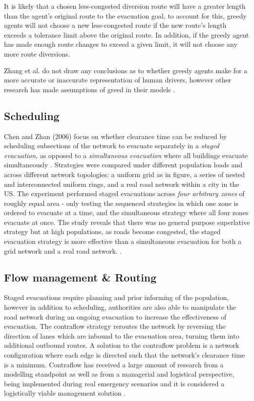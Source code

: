 It is likely that a chosen less-congested diversion route will have a greater length than the agent's original route to the evacuation goal, to account for this, greedy agents will not choose a new less-congested route if the new route's length exceeds a tolerance limit above the original route. In addition, if the greedy agent has made enough route changes to exceed a given limit, it will not choose any more route diversions.

Zhang et al. do not draw any conclusions as to whether greedy agents make for a more accurate or inaccurate representation of human drivers, however other research has made assumptions of greed in their models \cite{Madireddy2011AnManagement}.

\subsection{Scheduling}
Chen and Zhan (2006) focus on whether clearance time can be reduced by scheduling subsections of the network to evacuate separately in a \textit{staged evacuation}, as opposed to a \textit{simultaneous evacuation} where all buildings evacuate simultaneously \cite{Chen2008Agent-basedStrategies}. Strategies were compared under different population loads and across different network topologies: a uniform grid as in figure, a series of nested and interconnected uniform rings, and a real road network within a city in the US. The experiment performed staged evacuations across \textit{four arbitrary zones} of roughly equal area - only testing the sequenced strategies in which one zone is ordered to evacuate at a time, and the simultaneous strategy where all four zones evacuate at once. The study reveals that there was no general purpose superlative strategy but at high populations, as roads become congested, the staged evacuation strategy is more effective than a simultaneous evacuation for both a grid network and a real road network.
\cite{Bish2014OptimalRouting}.

\subsection{Flow management \& Routing}
Staged evacuations require planning and prior informing of the population, however in addition to scheduling, authorities are also able to manipulate the road network during an ongoing evacuation to increase the effectiveness of evacuation. The contraflow strategy reroutes the network by reversing the direction of lanes which are inbound to the evacuation area, turning them into additional outbound routes. A solution to the contraflow problem is a network configuration where each edge is directed such that the network's clearance time is a minimum. Contraflow has received a large amount of research from a modelling standpoint \cite{Cova2003ARouting,SanghoKim2008ContraflowPlanning} as well as from a managerial and logistical perspective, being implemented during real emergency scenarios and it is considered a logistically viable management solution \cite{Wolshon2001One-Way-Out:Evacuation}.

